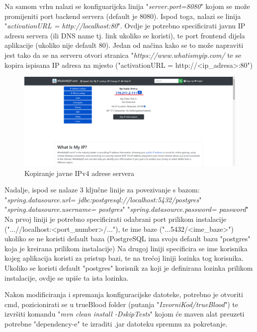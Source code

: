 			Na samom vrhu nalazi se konfiguarijcka linija "\textit{server.port=8080}" kojom se može promijeniti port backend servera (default je 8080).
			Ispod toga, nalazi se linija "\textit{activationURL = http://localhost:80}". Ovdje je potrebno specificirati javnu IP adresu servera (ili DNS name tj. link ukoliko se koristi), te port frontend dijela aplikacije (ukoliko nije default 80). Jedan od načina kako se to može napraviti jest tako da se na serveru otvori stranica "\textit{https://www.whatismyip.com/} te se kopira ispisana IP adresa na mjesto ("activationURL = http://<ip_adresa>:80")
			
			\begin{figure}[H]
			\centering
			\includegraphics[width=\textwidth, scale=0.5]{slike/WhatIsMyIp}
			\caption{Kopiranje javne IPv4 adrese servera}
			\label{fig:WhatIsMyIp}
			\end{figure}

			Nadalje, ispod se nalaze 3 ključne linije za povezivanje s bazom:
			"\textit{spring.datasource.url= jdbc:postgresql://localhost:5432/postgres}"
			"\textit{spring.datasource.username= postgres}"
			"\textit{spring.datasource.password= password}"
			Na prvoj liniji je potrebno specificirati odabrani port prilikom instalacije ("...//localhost:<port_number>/..."), te ime baze ("...5432/<ime_baze>") ukoliko se ne koristi default baza (PostgreSQL ima svoju default bazu "postgres" koja je kreirana prilikom instalacije)
			Na drugoj liniji specificira se ime korisnika kojeg aplikacija koristi za pristup bazi, te na trećoj liniji lozinka tog korisnika. Ukoliko se koristi default "postgres" korisnik za koji je definirana lozinka prilikom instalacije, ovdje se upiše ta ista lozinka.
			
			Nakon modificiranja i spremanja konfiguracijske datoteke, potrebno je otvoriti cmd, pozicionirati se u trueBlood folder (putanja "\textit{IzvorniKod/trueBlood}") te izvršiti komandu "\textit{mvn clean install -DskipTests}" kojom će maven alat preuzeti potrebne "dependency-e" te izraditi .jar datoteku spremnu za pokretanje.
			
